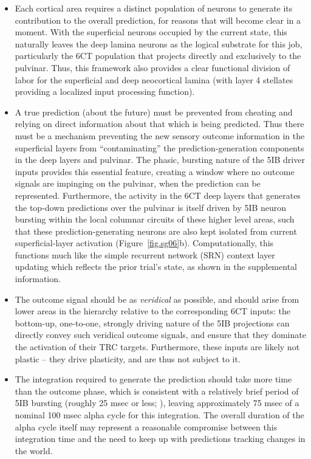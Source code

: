 \documentclass[11pt,twoside]{article}
\newif\myifpdf
\begin{document}
\begin{itemize}
	\item Each cortical area requires a distinct population of neurons to generate its contribution to the overall prediction, for reasons that will become clear in a moment. With the superficial neurons occupied by the current state, this naturally leaves the deep lamina neurons as the logical substrate for this job, particularly the 6CT population that projects directly and exclusively to the pulvinar.  Thus, this framework also provides a clear functional division of labor for the superficial and deep neocortical lamina (with layer 4 stellates providing a localized input processing function).
	
	\item A true prediction (about the future) must be prevented from cheating and relying on direct information about that which is being predicted.  Thus there must be a mechanism preventing the new sensory outcome information in the superficial layers from ``contaminating'' the prediction-generation components in the deep layers and pulvinar.  The phasic, bursting nature of the 5IB driver inputs provides this essential feature, creating a window where no outcome signals are impinging on the pulvinar, when the prediction can be represented.  Furthermore, the activity in the 6CT deep layers that generates the top-down predictions over the pulvinar is itself driven by 5IB neuron bursting within the local columnar circuits of these higher level areas, such that these prediction-generating neurons are also kept isolated from current superficial-layer activation  (Figure~\ref{fig.sg06}b).  Computationally, this functions much like the simple recurrent network (SRN) context layer updating \citep{Elman90,Jordan89} which reflects the prior trial's state, as shown in the supplemental information.

	\item The outcome signal should be as \emph{veridical} as possible, and should arise from lower areas in the hierarchy relative to the corresponding 6CT inputs: the bottom-up, one-to-one, strongly driving nature of the 5IB projections can directly convey such veridical outcome signals, and ensure that they dominate the activation of their TRC targets.  Furthermore, these inputs are likely not plastic \citep{UsreySherman18}-- they drive plasticity, and are thus not subject to it.

		\item The integration required to generate the prediction should take more time than the outcome phase, which is consistent with a relatively brief period of 5IB bursting (roughly 25 msec or less; \citealp{ConnorsGutnickPrince82}), leaving approximately 75 msec of a nominal 100 msec alpha cycle for this integration.  The overall duration of the alpha cycle itself may represent a reasonable compromise between this integration time and the need to keep up with predictions tracking changes in the world.


\end{itemize}
\end{document}
